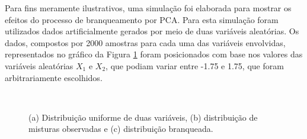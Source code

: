 
Para fins meramente ilustrativos, uma simulação foi elaborada para mostrar os efeitos do processo de branqueamento por PCA. Para esta simulação foram utilizados dados artificialmente gerados por meio de duas variáveis aleatórias. Os dados, compostos por 2000 amostras para cada uma das variáveis envolvidas, representados no gráfico da Figura \ref{fig:bss_whitening_data_uniform} foram posicionados com base nos valores das variáveis aleatórias $X_{1}$ e $X_{2}$, que podiam variar entre -1.75 e 1.75, que foram arbitrariamente escolhidos.






\begin{figure}[H]
    \centering
    \\
    \caption{(a) Distribuição uniforme de duas variáveis, (b) distribuição de misturas observadas e (c) distribuição branqueada.}
    \label{fig:bss_whitening_data_uniform}
\end{figure}



